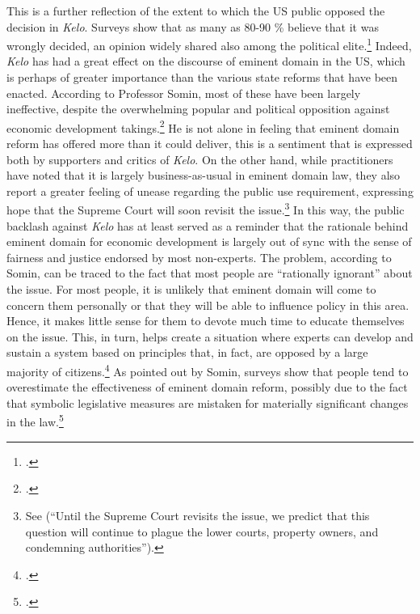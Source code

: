 This is a further reflection of the extent to which the US public opposed the decision in {\it Kelo}. Surveys show that as many as 80-90 \% believe that it was wrongly decided, an opinion widely shared also among the political elite.\footcite[2109]{somin09} Indeed, {\it Kelo} has had a great effect on the discourse of eminent domain in the US, which is perhaps of greater importance than the various state reforms that have been enacted. According to Professor Somin, most of these have been largely ineffective, despite the overwhelming popular and political opposition against economic development takings.\footcite[2170-2171]{somin09} He is not alone in feeling that eminent domain reform has offered more than it could deliver, this is a sentiment that is expressed both by supporters and critics of {\it Kelo}. On the other hand, while practitioners have noted that it is largely business-as-usual in eminent domain law, they also report a greater feeling of unease regarding the public use requirement, expressing hope that the Supreme Court will soon revisit the issue.\footnote{See \cite{murakami13} (``Until the Supreme Court revisits the issue, we predict that this question will continue to plague the lower courts, property owners, and condemning authorities'').} In this way, the public backlash against {\it Kelo} has at least served as a reminder that the rationale behind eminent domain for economic development is largely out of sync with the sense of fairness and justice endorsed by most non-experts. The problem, according to Somin, can be traced to the fact that most people are ``rationally ignorant'' about the issue. For most people, it is unlikely that eminent domain will come to concern them personally or that they will be able to influence policy in this area. Hence, it makes little sense for them to devote much time to educate themselves on the issue. This, in turn, helps create a situation where experts can develop and sustain a system based on principles that, in fact, are opposed by a large majority of citizens.\footcite[2163-2171]{somin09} As pointed out by Somin, surveys show that people tend to overestimate the effectiveness of eminent domain reform, possibly due to the fact that symbolic legislative measures are mistaken for materially significant changes in the law.\footcite{somin09}

